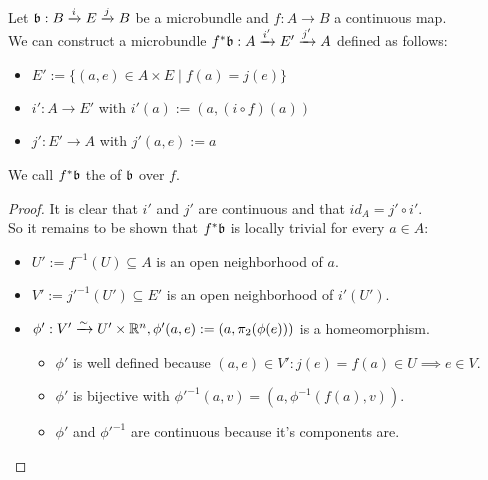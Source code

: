 \\ Let $\bb: \bundle{B}{E}{i}{j}$ be a microbundle and $f: A \to B$ a continuous map.
\\ We can construct a microbundle $f^*\bb: \bundle{A}{E'}{i'}{j'}$ defined as follows:
\begin{itemize}
    \item $E' := \{ (a, e) \in A \times E \mid f(a) = j(e) \}$
    \item $i': A \to E'$ with $i'(a) := (a, (i \circ f)(a))$
    \item $j': E' \to A$ with $j'(a, e) := a$
\end{itemize}
We call $f^*\bb$ the  of $\bb$ over $f$.
\begin{proof}
It is clear that $i'$ and $j'$ are continuous and that $id_A = j' \circ i'$.
\\ So it remains to be shown that $f^*\bb$ is locally trivial for every $a \in A$:
\begin{itemize}
    \item $U' := f^{-1}(U) \subseteq A$ is an open neighborhood of $a$.
    \item $V' := j'^{-1}(U') \subseteq E'$ is an open neighborhood of $i'(U')$.
    \item $\phi': V' \isomto U' \times \R^n, \phi'(a, e) := (a, \pi_2(\phi(e)))$ is a homeomorphism.
    \begin{itemize}
        \item $\phi'$ is well defined because $(a, e) \in V': j(e) = f(a) \in U \implies e \in V$.
        \item $\phi'$ is bijective with $\phi'^{-1}(a, v) = (a, \phi^{-1}(f(a), v))$.
        \item $\phi'$ and $\phi'^{-1}$ are continuous because it's components are.
    \end{itemize}
\end{itemize}
\end{proof}